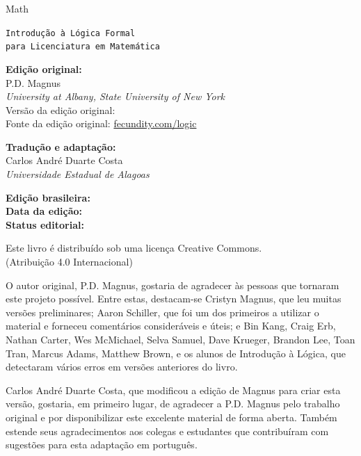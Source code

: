 \thispagestyle{empty}
{\Huge\textcolor{burntorange}{Math}\forallx}

{\tt Introdução à Lógica Formal\\ para \textcolor{burntorange}{Licenciatura em Matemática}}

\vfill

{\sf \textbf{Edição original:}}\\
{\sf P.D. Magnus}\\
\emph{University at Albany, State University of New York}\\
{\sf Versão da edição original: \editionoriginalversion}\\
{\sf Fonte da edição original: \href{https://www.fecundity.com/logic/}{fecundity.com/logic}}

\vfill

{\sf \textbf{Tradução e adaptação:}}\\
{\sf Carlos André Duarte Costa}\\
\emph{Universidade Estadual de Alagoas}

\vspace{1em}

{\sf \textbf{Edição brasileira:} \editionversion}\\
{\sf \textbf{Data da edição:} \editiondate}\\
{\sf \textbf{Status editorial:} \editionstatus}

\vfill

{\sf
Este livro é distribuído sob uma licença Creative Commons.\\
(Atribuição 4.0 Internacional)
}

\newpage
\thispagestyle{empty}%
{\sf
O autor original, P.D. Magnus, gostaria de agradecer às pessoas que tornaram este projeto possível. Entre estas, destacam-se Cristyn Magnus, que leu muitas versões preliminares; Aaron Schiller, que foi um dos primeiros a utilizar o material e forneceu comentários consideráveis e úteis; e Bin Kang, Craig Erb, Nathan Carter, Wes McMichael, Selva Samuel, Dave Krueger, Brandon Lee, Toan Tran, Marcus Adams, Matthew Brown, e os alunos de Introdução à Lógica, que detectaram vários erros em versões anteriores do livro.

Carlos André Duarte Costa, que modificou a edição de Magnus para criar esta versão, gostaria, em primeiro lugar, de agradecer a P.D. Magnus pelo trabalho original e por disponibilizar este excelente material de forma aberta. Também estende seus agradecimentos aos colegas e estudantes que contribuíram com sugestões para esta adaptação em português.
}

